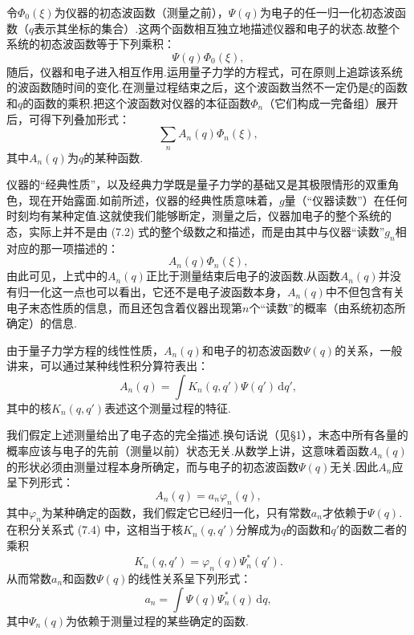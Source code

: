 令$\varPhi_0(\xi)$为仪器的初态波函数（测量之前），$\varPsi(q)$为电子的任一归一化初态波函数（$q$表示其坐标的集合）.这两个函数相互独立地描述仪器和电子的状态.故整个系统的初态波函数等于下列乘积：
\begin{equation}
  \varPsi(q)\varPhi_0(\xi),
\end{equation}
随后，仪器和电子进入相互作用.运用量子力学的方程式，可在原则上追踪该系统的波函数随时间的变化.在测量过程结束之后，这个波函数当然不一定仍是$\xi$的函数和$q$的函数的乘积.把这个波函数对仪器的本征函数$\varPhi_n$（它们构成一完备组）展开后，可得下列叠加形式：
\begin{equation}
  \sum_n A_n(q)\varPhi_n(\xi),
\end{equation}
其中$A_n(q)$为$q$的某种函数.

仪器的“经典性质”，以及经典力学既是量子力学的基础又是其极限情形的双重角色，现在开始露面.如前所述，仪器的经典性质意味着，$g$量（“仪器读数”）在任何时刻均有某种定值.这就使我们能够断定，测量之后，仪器加电子的整个系统的态，实际上并不是由 (7.2) 式的整个级数之和描述，而是由其中与仪器“读数”$g_n$相对应的那一项描述的：
\begin{equation}
  A_n(q)\varPhi_n(\xi),
\end{equation}
由此可见，上式中的$A_n(q)$正比于测量结束后电子的波函数.从函数$A_n(q)$并没有归一化这一点也可以看出，它还不是电子波函数本身，$A_n(q)$中不但包含有关电子末态性质的信息，而且还包含着仪器出现第$n$个“读数”的概率（由系统初态所确定）的信息.

由于量子力学方程的线性性质，$A_n(q)$和电子的初态波函数$\varPsi(q)$的关系，一般讲来，可以通过某种线性积分算符表出：
\begin{equation}
  A_n(q)=\int K_n(q,q')\varPsi(q')\,\mathrm{d}q',
\end{equation}
其中的核$K_n(q,q')$表述这个测量过程的特征.

我们假定上述测量给出了电子态的完全描述.换句话说（见§1），末态中所有各量的概率应该与电子的先前（测量以前）状态无关.从数学上讲，这意味着函数$A_n(q)$的形状必须由测量过程本身所确定，而与电子的初态波函数$\varPsi(q)$无关.因此$A_n$应呈下列形式：
\begin{equation}
  A_n(q)=a_n\varphi_n(q),
\end{equation}
其中$\varphi_n$为某种确定的函数，我们假定它已经归一化，只有常数$a_n$才依赖于$\varPsi(q)$.在积分关系式 (7.4) 中，这相当于核$K_n(q,q')$分解成为$q$的函数和$q'$的函数二者的乘积
\begin{equation}
  K_n(q,q')=\varphi_n(q)\varPsi_n^{*}(q').
\end{equation}
从而常数$a_n$和函数$\varPsi(q)$的线性关系呈下列形式：
\begin{equation}
  a_n=\int\varPsi(q)\varPsi_n^{*}(q)\,\mathrm{d}q,
\end{equation}
其中$\varPsi_n(q)$为依赖于测量过程的某些确定的函数.

